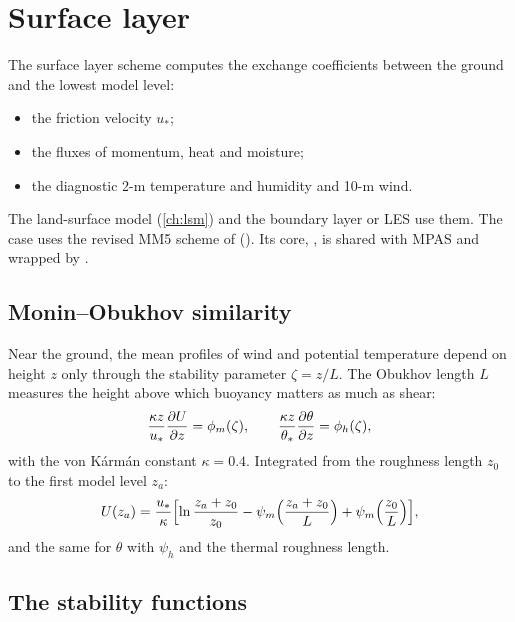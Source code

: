 \chapter{Surface layer}\label{ch:sfc}

The surface layer scheme computes the exchange coefficients between the ground and the lowest model level:
\begin{itemize}
  \item the friction velocity $u_*$;
  \item the fluxes of momentum, heat and moisture;
  \item the diagnostic 2-m temperature and humidity and 10-m wind.
\end{itemize}
The land-surface model (\cref{ch:lsm}) and the boundary layer or LES use them. The case uses the revised MM5 scheme
of \citet{jimenez2012} (). Its core, ,
is shared with MPAS and wrapped by .

\section{Monin--Obukhov similarity}

Near the ground, the mean profiles of wind and potential temperature depend on height $z$ only through the stability
parameter $\zeta = z/L$. The Obukhov length $L$ measures the height above which buoyancy matters as much as shear:
\begin{equation}
  \frac{\kappa z}{u_*}\frac{\partial U}{\partial z} = \phi_m(\zeta), \qquad
  \frac{\kappa z}{\theta_*}\frac{\partial \theta}{\partial z} = \phi_h(\zeta),
\end{equation}
with the von K\'arm\'an constant $\kappa = 0.4$. Integrated from the roughness length $z_0$ to the first model level
$z_a$:
\begin{equation}
  U(z_a) = \frac{u_*}{\kappa}\Bigl[\ln\frac{z_a + z_0}{z_0} - \psi_m\Bigl(\frac{z_a + z_0}{L}\Bigr) + \psi_m\Bigl(\frac{z_0}{L}\Bigr)\Bigr],
\end{equation}
and the same for $\theta$ with $\psi_h$ and the thermal roughness length.

\section{The stability functions}

